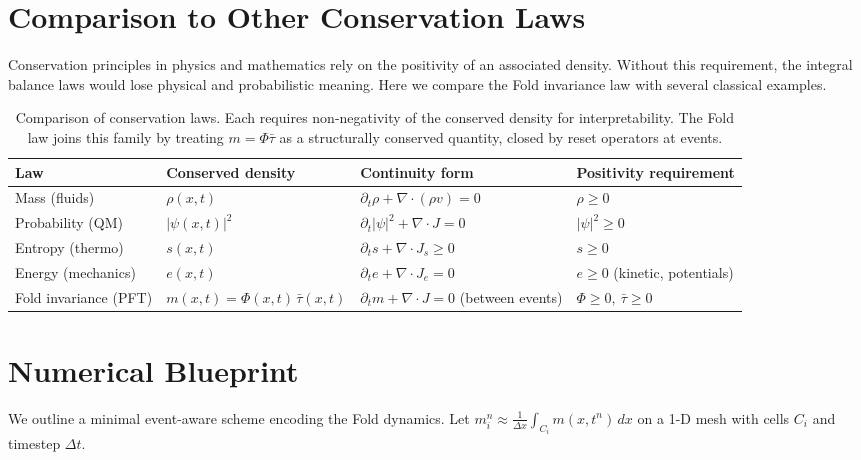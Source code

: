 \documentclass[11pt]{article}
\begin{document}
\section{Comparison to Other Conservation Laws}

Conservation principles in physics and mathematics rely on the 
positivity of an associated density. Without this requirement, the 
integral balance laws would lose physical and probabilistic meaning. 
Here we compare the Fold invariance law with several classical 
examples.

\begin{table}[h!]
\centering
\renewcommand{\arraystretch}{1.3}
\begin{tabularx}{\textwidth}{|l|X|X|l|}
\hline
\textbf{Law} & \textbf{Conserved density} & \textbf{Continuity form} & \textbf{Positivity requirement} \\
\hline
Mass (fluids) & $\rho(x,t)$ & $\partial_t \rho + \nabla\cdot(\rho v) = 0$ & $\rho \geq 0$ \\ 
\hline
Probability (QM) & $|\psi(x,t)|^2$ & $\partial_t |\psi|^2 + \nabla \cdot J = 0$ & $|\psi|^2 \geq 0$ \\ 
\hline
Entropy (thermo) & $s(x,t)$ & $\partial_t s + \nabla\cdot J_s \geq 0$ & $s \geq 0$ \\ 
\hline
Energy (mechanics) & $e(x,t)$ & $\partial_t e + \nabla\cdot J_e = 0$ & $e \geq 0$ (kinetic, potentials) \\ 
\hline
Fold invariance (PFT) & $m(x,t)=\Phi(x,t)\,\bar{\tau}(x,t)$ & $\partial_t m + \nabla \cdot J = 0$ (between events) & $\Phi \geq 0, \ \bar{\tau} \geq 0$ \\ 
\hline
\end{tabularx}
\caption{Comparison of conservation laws. Each requires non-negativity 
of the conserved density for interpretability. The Fold law joins this 
family by treating $m=\Phi\bar{\tau}$ as a structurally conserved 
quantity, closed by reset operators at events.}
\end{table}


\section{Numerical Blueprint}

We outline a minimal event-aware scheme encoding the Fold dynamics.
Let $m_i^n \approx \frac{1}{\Delta x}\int_{C_i} m(x,t^n)\,dx$ on a 1-D mesh
with cells $C_i$ and timestep $\Delta t$.
\end{document}
